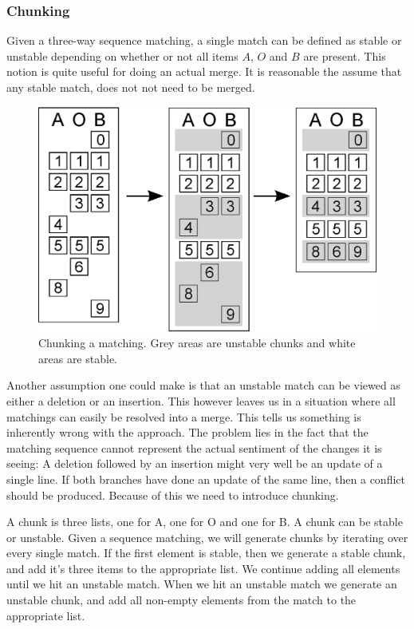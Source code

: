 \documentclass[11pt]{article}
\begin{document}
\subsubsection{Chunking}
Given a three-way sequence matching, a single match can be defined as stable or unstable depending on whether or not all items $A$, $O$ and $B$ are present. This notion is quite useful for doing an actual merge. It is reasonable the assume that any stable match, does not not need to be merged.

\begin{figure}
   \centerline{\includegraphics[scale=0.4]{drawings/eps/threewaymatching-chunking.eps}}
   \caption{Chunking a matching. Grey areas are unstable chunks and white areas are stable.}
   \label{Chunking}
\end{figure}

Another assumption one could make is that an unstable match can be viewed as either a deletion or an insertion. This however leaves us in a situation where all matchings can easily be resolved into a merge. This tells us something is inherently wrong with the approach. The problem lies in the fact that the matching sequence cannot represent the actual sentiment of the changes it is seeing: A deletion followed by an insertion might very well be an update of a single line. If both branches have done an update of the same line, then a conflict should be produced. Because of this we need to introduce chunking.

A chunk is three lists, one for A, one for O and one for B. A chunk can be stable or unstable. Given a sequence matching, we will generate chunks by iterating over every single match. If the first element is stable, then we generate a stable chunk, and add it's three items to the appropriate list. We continue adding all elements until we hit an unstable match. When we hit an unstable match we generate an unstable chunk, and add all non-empty elements from the match to the appropriate list.
\end{document}
